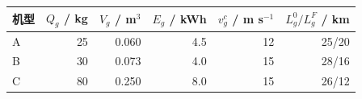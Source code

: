 \begin{tabular}{lrrrrr}
\toprule
机型 & $Q_g$ / kg & $V_g$ / m$^3$ & $E_g$ / kWh & $v_g^c$ / m s$^{-1}$ & $L_g^0/L_g^F$ / km \\
\midrule
A & 25 & 0.060 & 4.5 & 12 & 25/20 \\
B & 30 & 0.073 & 4.0 & 15 & 28/16 \\
C & 80 & 0.250 & 8.0 & 15 & 26/12 \\
\bottomrule
\end{tabular}

